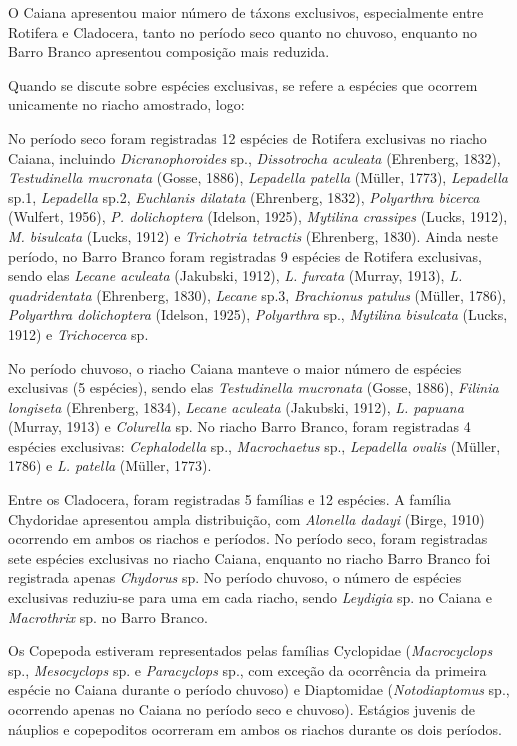 \documentclass[
  letterpaper,
  DIV=11,
  numbers=noendperiod]{scrartcl}
\begin{document}
O Caiana apresentou maior número de táxons exclusivos, especialmente
entre Rotifera e Cladocera, tanto no período seco quanto no chuvoso,
enquanto no Barro Branco apresentou composição mais reduzida.

Quando se discute sobre espécies exclusivas, se refere a espécies que
ocorrem unicamente no riacho amostrado, logo:

No período seco foram registradas 12 espécies de Rotifera exclusivas no
riacho Caiana, incluindo \emph{Dicranophoroides} sp., \emph{Dissotrocha
aculeata} (Ehrenberg, 1832), \emph{Testudinella mucronata} (Gosse,
1886), \emph{Lepadella patella} (Müller, 1773), \emph{Lepadella} sp.1,
\emph{Lepadella} sp.2, \emph{Euchlanis dilatata} (Ehrenberg, 1832),
\emph{Polyarthra bicerca} (Wulfert, 1956), \emph{P. dolichoptera}
(Idelson, 1925), \emph{Mytilina crassipes} (Lucks, 1912), \emph{M.
bisulcata} (Lucks, 1912) e \emph{Trichotria tetractis} (Ehrenberg,
1830). Ainda neste período, no Barro Branco foram registradas 9 espécies
de Rotifera exclusivas, sendo elas \emph{Lecane aculeata} (Jakubski,
1912), \emph{L. furcata} (Murray, 1913), \emph{L. quadridentata}
(Ehrenberg, 1830), \emph{Lecane} sp.3, \emph{Brachionus patulus}
(Müller, 1786), \emph{Polyarthra dolichoptera} (Idelson, 1925),
\emph{Polyarthra} sp., \emph{Mytilina bisulcata} (Lucks, 1912) e
\emph{Trichocerca} sp.

No período chuvoso, o riacho Caiana manteve o maior número de espécies
exclusivas (5 espécies), sendo elas \emph{Testudinella mucronata}
(Gosse, 1886), \emph{Filinia longiseta} (Ehrenberg, 1834), \emph{Lecane
aculeata} (Jakubski, 1912), \emph{L. papuana} (Murray, 1913) e
\emph{Colurella} sp. No riacho Barro Branco, foram registradas 4
espécies exclusivas: \emph{Cephalodella} sp., \emph{Macrochaetus} sp.,
\emph{Lepadella} \emph{ovalis} (Müller, 1786) e \emph{L. patella}
(Müller, 1773).

Entre os Cladocera, foram registradas 5 famílias e 12 espécies. A
família Chydoridae apresentou ampla distribuição, com \emph{Alonella
dadayi} (Birge, 1910) ocorrendo em ambos os riachos e períodos. No
período seco, foram registradas sete espécies exclusivas no riacho
Caiana, enquanto no riacho Barro Branco foi registrada apenas
\emph{Chydorus} sp. No período chuvoso, o número de espécies exclusivas
reduziu-se para uma em cada riacho, sendo \emph{Leydigia} sp. no Caiana
e \emph{Macrothrix} sp. no Barro Branco.

Os Copepoda estiveram representados pelas famílias Cyclopidae
(\emph{Macrocyclops} sp., \emph{Mesocyclops} sp. e \emph{Paracyclops}
sp., com exceção da ocorrência da primeira espécie no Caiana durante o
período chuvoso) e Diaptomidae (\emph{Notodiaptomus} sp., ocorrendo
apenas no Caiana no período seco e chuvoso). Estágios juvenis de
náuplios e copepoditos ocorreram em ambos os riachos durante os dois
períodos.
\end{document}
